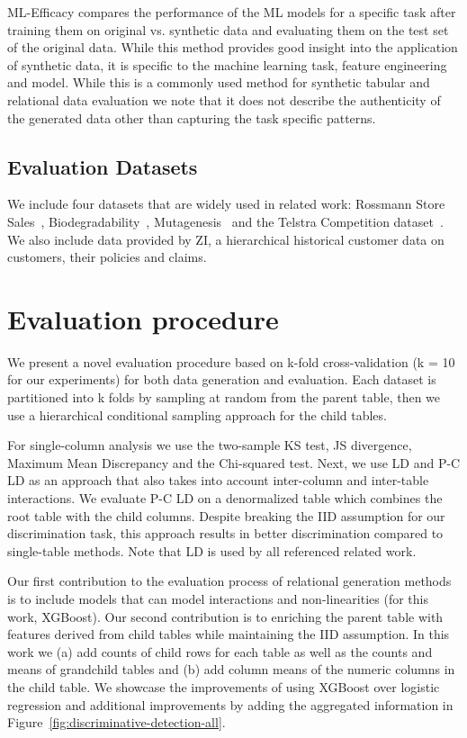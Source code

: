 \documentclass[fleqn,moreauthors,10pt]{ds_report}
\begin{document}
ML-Efficacy compares the performance of the ML models for a specific task after training them on original vs. synthetic data and evaluating them on the test set of the original data. 
While this method provides good insight into the application of synthetic data, it is specific to the machine learning task, feature engineering and model. While this is a commonly used method for synthetic tabular and relational data evaluation we note that it does not describe the authenticity of the generated data other than capturing the task specific patterns.

\subsection{Evaluation Datasets}
We include four datasets that are widely used in related work: Rossmann Store Sales~\cite{rossmann_kaggle}, Biodegradability~\cite{biodegradability}, Mutagenesis~\cite{mutagenesis} and the Telstra Competition dataset~\cite{telstra_kaggle}. We also include data provided by ZI, a hierarchical historical customer data on customers, their policies and claims.

\section{Evaluation procedure}
We present a novel evaluation procedure based on k-fold cross-validation (k = 10 for our experiments) for both data generation and evaluation. Each dataset is partitioned into k folds by sampling at random from the parent table, then we use a hierarchical conditional sampling approach for the child tables. 

For single-column analysis we use the two-sample KS test, JS divergence, Maximum Mean Discrepancy and the Chi-squared test. Next, we use LD and P-C LD as an approach that also takes into account inter-column and inter-table interactions. We evaluate P-C LD on a denormalized table which combines the root table with the child columns. Despite breaking the IID assumption for our discrimination task, this approach results in better discrimination compared to single-table methods. Note that LD is used by all referenced related work.

Our first contribution to the evaluation process of relational generation methods is to include models that can model interactions and non-linearities (for this work, XGBoost). Our second contribution is to enriching the parent table with features derived from child tables while maintaining the IID assumption. In this work we (a) add counts of child rows for each table as well as the counts and means of grandchild tables and (b) add column means of the numeric columns in the child table. We showcase the improvements of using XGBoost over logistic regression and additional improvements by adding the aggregated information in Figure~\ref{fig:discriminative-detection-all}.
\end{document}
